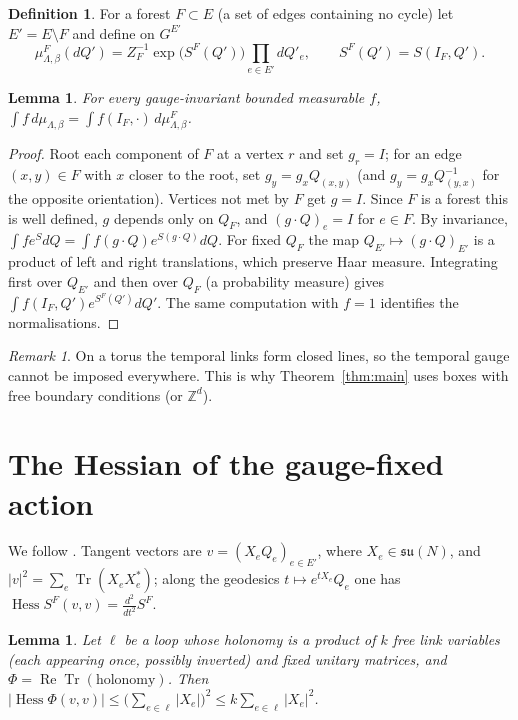 \documentclass[11pt]{amsart}
\newtheorem{lemma}[theorem]{Lemma}
\theoremstyle{definition}
\newtheorem{definition}[theorem]{Definition}
\theoremstyle{remark}
\newtheorem{remark}[theorem]{Remark}
\newcommand{\Tr}{\operatorname{Tr}}
\renewcommand{\Re}{\operatorname{Re}}
\newcommand{\Hess}{\operatorname{Hess}}
\begin{document}
\begin{definition}
For a forest $F\subset E$ (a set of edges containing no cycle) let $E'=E\setminus F$ and define on $G^{E'}$
\[
\mu^F_{\Lambda,\beta}(dQ')=Z_F^{-1}\exp\big(S^F(Q')\big)\prod_{e\in E'}dQ'_e,\qquad S^F(Q')=S(I_F,Q').
\]
\end{definition}

\begin{lemma}\label{lem:gauge}
For every gauge-invariant bounded measurable $f$,
$\int f\,d\mu_{\Lambda,\beta}=\int f(I_F,\cdot)\,d\mu^F_{\Lambda,\beta}$.
\end{lemma}

\begin{proof}
Root each component of $F$ at a vertex $r$ and set $g_r=I$; for an edge $(x,y)\in F$ with $x$ closer to the root,
set $g_y=g_xQ_{(x,y)}$ (and $g_y=g_xQ_{(y,x)}^{-1}$ for the opposite orientation). Vertices not met by $F$ get
$g=I$. Since $F$ is a forest this is well defined, $g$ depends only on $Q_F$, and $(g\cdot Q)_e=I$ for $e\in F$. By
invariance, $\int f e^{S}dQ=\int f(g\cdot Q)e^{S(g\cdot Q)}dQ$. For fixed $Q_F$ the map
$Q_{E'}\mapsto(g\cdot Q)_{E'}$ is a product of left and right translations, which preserve Haar measure. Integrating
first over $Q_{E'}$ and then over $Q_F$ (a probability measure) gives $\int f(I_F,Q')e^{S^F(Q')}dQ'$. The same
computation with $f=1$ identifies the normalisations.
\end{proof}

\begin{remark}
On a torus the temporal links form closed lines, so the temporal gauge cannot be imposed everywhere. This is why
Theorem~\ref{thm:main} uses boxes with free boundary conditions (or $\mathbb{Z}^d$).
\end{remark}

\section{The Hessian of the gauge-fixed action}

We follow \cite{SZZ}. Tangent vectors are $v=(X_eQ_e)_{e\in E'}$, where $X_e\in\mathfrak{su}(N)$,
and $|v|^2=\sum_e\Tr(X_eX_e^*)$; along the geodesics $t\mapsto e^{tX_e}Q_e$ one has $\Hess S^F(v,v)=\frac{d^2}{dt^2}S^F$.

\begin{lemma}\label{lem:loop}
Let $\ell$ be a loop whose holonomy is a product of $k$ free link variables (each appearing once, possibly inverted)
and fixed unitary matrices, and $\Phi=\Re\Tr(\text{holonomy})$. Then
$|\Hess\Phi(v,v)|\le\big(\sum_{e\in\ell}|X_e|\big)^2\le k\sum_{e\in\ell}|X_e|^2$.
\end{lemma}
\end{document}
